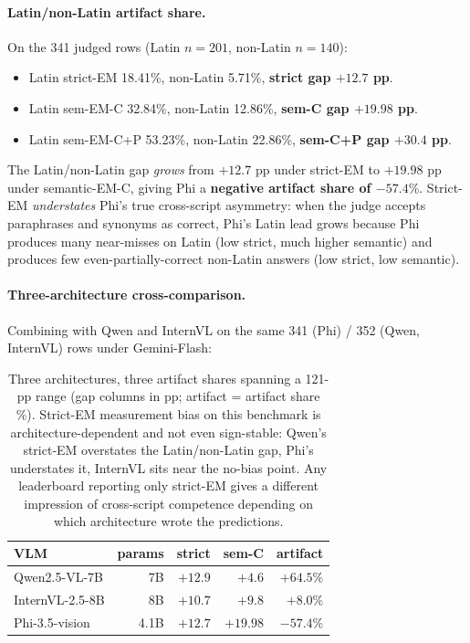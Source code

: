 \paragraph{Latin/non-Latin artifact share.}
On the 341 judged rows (Latin $n=201$, non-Latin $n=140$):
\begin{itemize}
\item Latin strict-EM 18.41\%, non-Latin 5.71\%, \textbf{strict gap $+12.7$ pp}.
\item Latin sem-EM-C 32.84\%, non-Latin 12.86\%, \textbf{sem-C gap $+19.98$ pp}.
\item Latin sem-EM-C+P 53.23\%, non-Latin 22.86\%, \textbf{sem-C+P gap $+30.4$ pp}.
\end{itemize}
The Latin/non-Latin gap \emph{grows} from $+12.7$ pp under strict-EM to $+19.98$ pp under semantic-EM-C, giving Phi a \textbf{negative artifact share of $-57.4\%$}. Strict-EM \emph{understates} Phi's true cross-script asymmetry: when the judge accepts paraphrases and synonyms as correct, Phi's Latin lead grows because Phi produces many near-misses on Latin (low strict, much higher semantic) and produces few even-partially-correct non-Latin answers (low strict, low semantic).

\paragraph{Three-architecture cross-comparison.}
Combining with Qwen and InternVL on the same 341 (Phi) / 352 (Qwen, InternVL) rows under Gemini-Flash:

\begin{table}[t]
\centering
\small
\begin{tabular}{lrrrr}
\toprule
VLM & params & strict & sem-C & artifact \\
\midrule
Qwen2.5-VL-7B  & 7B   & $+12.9$ & $+4.6$  & $\mathbf{+64.5\%}$ \\
InternVL-2.5-8B& 8B   & $+10.7$ & $+9.8$  & $+8.0\%$ \\
Phi-3.5-vision & 4.1B & $+12.7$ & $+19.98$ & $\mathbf{-57.4\%}$ \\
\bottomrule
\end{tabular}
\caption{Three architectures, three artifact shares spanning a 121-pp range (gap columns in pp; artifact = artifact share \%). Strict-EM measurement bias on this benchmark is architecture-dependent and not even sign-stable: Qwen's strict-EM overstates the Latin/non-Latin gap, Phi's understates it, InternVL sits near the no-bias point. Any leaderboard reporting only strict-EM gives a different impression of cross-script competence depending on which architecture wrote the predictions.}
\label{tab:three-vlm-artifact}
\end{table}

